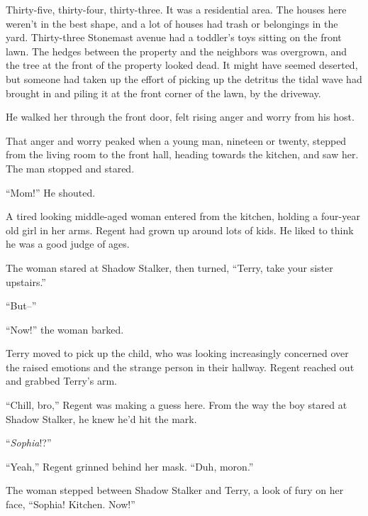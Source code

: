Thirty-five, thirty-four, thirty-three.  It was a residential area.  The houses here weren't in the best shape, and a lot of houses had trash or belongings in the yard.  Thirty-three Stonemast avenue had a toddler's toys sitting on the front lawn.  The hedges between the property and the neighbors was overgrown, and the tree at the front of the property looked dead.  It might have seemed deserted, but someone had taken up the effort of picking up the detritus the tidal wave had brought in and piling it at the front corner of the lawn, by the driveway.



He walked her through the front door, felt rising anger and worry from his host.



That anger and worry peaked when a young man, nineteen or twenty, stepped from the living room to the front hall, heading towards the kitchen, and saw her.  The man stopped and stared.



``Mom!''  He shouted.



A tired looking middle-aged woman entered from the kitchen, holding a four-year old girl in her arms.  Regent had grown up around lots of kids.  He liked to think he was a good judge of ages.



The woman stared at Shadow Stalker, then turned, ``Terry, take your sister upstairs.''



``But--''



``Now!'' the woman barked.



Terry moved to pick up the child, who was looking increasingly concerned over the raised emotions and the strange person in their hallway.  Regent reached out and grabbed Terry's arm.



``Chill, bro,''  Regent was making a guess here.  From the way the boy stared at Shadow Stalker, he knew he'd hit the mark.



``\emph{Sophia}!?''



``Yeah,'' Regent grinned behind her mask.  ``Duh, moron.''



The woman stepped between Shadow Stalker and Terry, a look of fury on her face, ``Sophia!  Kitchen.  Now!''



